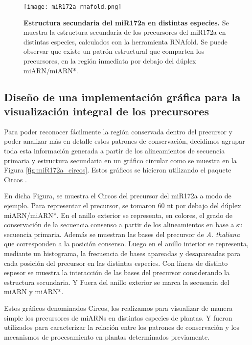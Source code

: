 \begin{landscape}
    \begin{figure}[htbp!] 
        \centering    
        \texttt{[image: miR172a\_rnafold.png]}
        \caption[Estructura secundaria del miR172a en distintas especies]{
        \textbf{Estructura secundaria del miR172a en distintas especies.}
        Se muestra la estructura secundaria de los precursores del miR172a en distintas especies, calculados con la herramienta RNAfold.
        Se puede observar que existe un patrón estructural que comparten los precursores, en la región inmediata por debajo del dúplex miARN/miARN*.
        }
        \label{fig:miR172a_rnafold}
    \end{figure}
\end{landscape}


\subsection{Diseño de una implementación gráfica para la visualización integral de los precursores}

Para poder reconocer fácilmente la región conservada dentro del precursor y poder analizar más en detalle estos patrones de conservación, decidimos agrupar toda esta información 
generada a partir de los alineamientos de secuencia primaria y estructura secundaria en un gráfico circular como se muestra en la Figura \ref{fig:miR172a_circos}.
Estos gráficos se hicieron utilizando el paquete Circos \citep{pmid19541911}.
 
En dicha Figura, se muestra el Circos del precursor del miR172a a modo de ejemplo.
Para representar el precursor, se tomaron 60 nt por debajo del dúplex miARN/miARN*.
En el anillo exterior se representa, en colores, el grado de conservación de la secuencia consenso a partir de los alineamientos en base a su secuencia primaria.
Además se muestran las bases del precursor de \textit {A. thaliana} que corresponden a la posición consenso.
Luego en el anillo interior se representa, mediante un histograma, la frecuencia de bases apareadas y desapareadas para cada posición del precursor en las distintas especies.
Con líneas de distinto espesor se muestra la interacción de las bases del precursor considerando la estructura secundaria. 
Y Fuera del anillo exterior se marca la secuencia del miARN y miARN*.

Estos gráficos denominados Circos, los realizamos para visualizar de manera simple los precursores de miARNs en distintas especies de plantas.
Y fueron utilizados para caracterizar la relación entre los patrones de conservación y los mecanismos de procesamiento en plantas determinados previamente.


